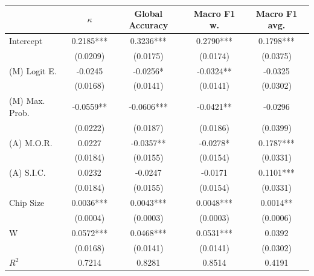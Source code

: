 \documentclass[]{interact}
\theoremstyle{plain}%
\theoremstyle{definition}
\theoremstyle{remark}
\begin{document}
\begin{table}
        \centering
\begin{tabular}{lcccc}
\toprule
{} &    $\kappa$ & Global Accuracy & Macro F1 w. & Macro F1 avg. \\
\midrule
Intercept                                         &  0.2185*** &        0.3236*** &    0.2790*** &      0.1798*** \\
                                                  &   (0.0209) &         (0.0175) &     (0.0174) &       (0.0375) \\
(M) Logit E.                                       &    -0.0245 &         -0.0256* &    -0.0324** &        -0.0325 \\
                                                  &   (0.0168) &         (0.0141) &     (0.0141) &       (0.0302) \\
(M) Max. Prob.                                     &  -0.0559** &       -0.0606*** &    -0.0421** &        -0.0296 \\
                                                  &   (0.0222) &         (0.0187) &     (0.0186) &       (0.0399) \\
(A) M.O.R.                                         &     0.0227 &        -0.0357** &     -0.0278* &      0.1787*** \\
                                                  &   (0.0184) &         (0.0155) &     (0.0154) &       (0.0331) \\
(A) S.I.C.                                         &     0.0232 &          -0.0247 &      -0.0171 &      0.1101*** \\
                                                  &   (0.0184) &         (0.0155) &     (0.0154) &       (0.0331) \\
Chip Size                                         &  0.0036*** &        0.0043*** &    0.0048*** &       0.0014** \\
                                                  &   (0.0004) &         (0.0003) &     (0.0003) &       (0.0006) \\
W                                                 &  0.0572*** &        0.0468*** &    0.0531*** &         0.0392 \\
                                                  &   (0.0168) &         (0.0141) &     (0.0141) &       (0.0302) \\
\midrule
$R^2$                                             &     0.7214 &           0.8281 &       0.8514 &         0.4191 \\

\end{tabular}
\end{table}
\end{document}
